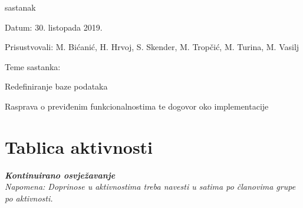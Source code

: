 \begin{packed_enum}
			\item  sastanak
			\item[] \begin{packed_item}
				\item Datum: 30. listopada 2019.
				\item Prisustvovali: M. Bićanić, H. Hrvoj, S. Skender, M. Tropčić, M. Turina, M. Vasilj
				\item Teme sastanka:
				\begin{packed_item}
					\item  Redefiniranje baze podataka
					\item  Rasprava o previđenim funkcionalnostima te dogovor oko implementacije
				\end{packed_item}
			\end{packed_item}
			
		\end{packed_enum}
		
		\eject
		\section*{Tablica aktivnosti}
		
			\textbf{\textit{Kontinuirano osvježavanje}}\\
			
			 \textit{Napomena: Doprinose u aktivnostima treba navesti u satima po članovima grupe po aktivnosti.}
					
						
			
